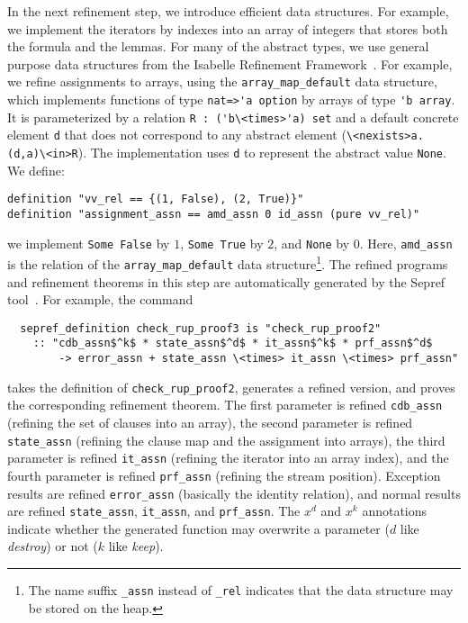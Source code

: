 \documentclass[smallcondensed]{svjour3}     %
\newcommand{\isai}{\lstinline[language=isabelle,basicstyle=\normalsize\ttfamily\slshape]}
\begin{document}
In the next refinement step, we introduce efficient data structures. For example, we implement the iterators by indexes 
into an array of integers that stores both the formula and the lemmas.
For many of the abstract types, we use general purpose data structures from the Isabelle Refinement Framework~\cite{La15,La16}.
For example, we refine assignments to arrays, using the \isai{array_map_default} data structure, which implements functions of type \isai{nat=>'a option} by
arrays of type \isai$'b array$. It is parameterized by a relation \isai$R : ('b\<times>'a) set$ and a default concrete element \isai$d$ that does not correspond to 
any abstract element (\isai$\<nexists>a. (d,a)\<in>R$). The implementation uses \isai$d$ to represent the abstract value \isai$None$.
We define:
\begin{lstlisting}
definition "vv_rel == {(1, False), (2, True)}"
definition "assignment_assn == amd_assn 0 id_assn (pure vv_rel)"
\end{lstlisting}
\ie we implement \isai{Some False} by $1$, \isai{Some True} by $2$, and \isai$None$ by $0$.
Here, \isai$amd_assn$ is the relation of the \isai$array_map_default$ data structure\footnote{The name suffix \isai$_assn$ instead of \isai$_rel$ 
indicates that the data structure may be stored on the heap.}.
The refined programs and refinement theorems in this step are automatically generated by the Sepref tool~\cite{La15}. For example, the command
\begin{lstlisting}
  sepref_definition check_rup_proof3 is "check_rup_proof2"
    :: "cdb_assn$^k$ * state_assn$^d$ * it_assn$^k$ * prf_assn$^d$ 
        -> error_assn + state_assn \<times> it_assn \<times> prf_assn"
\end{lstlisting}
takes the definition of \isai{check_rup_proof2}, generates a refined version, and proves the corresponding refinement theorem.
The first parameter is refined \wrt \isai{cdb_assn} (refining the set of clauses into an array), 
the second parameter is refined \wrt \isai{state_assn} (refining the clause map and the assignment into arrays), the third parameter is refined 
\wrt \isai{it_assn} (refining the iterator into an array index), and the fourth parameter is refined \wrt \isai{prf_assn} (refining the stream position). 
Exception results are refined \wrt \isai{error_assn} (basically the identity relation), and normal results are refined \wrt \isai{state_assn}, \isai{it_assn}, and \isai{prf_assn}.
The $x^d$ and $x^k$ annotations indicate whether the generated function may overwrite a parameter ($d$ like {\em destroy}) or not ($k$ like {\em keep}). 
\end{document}
